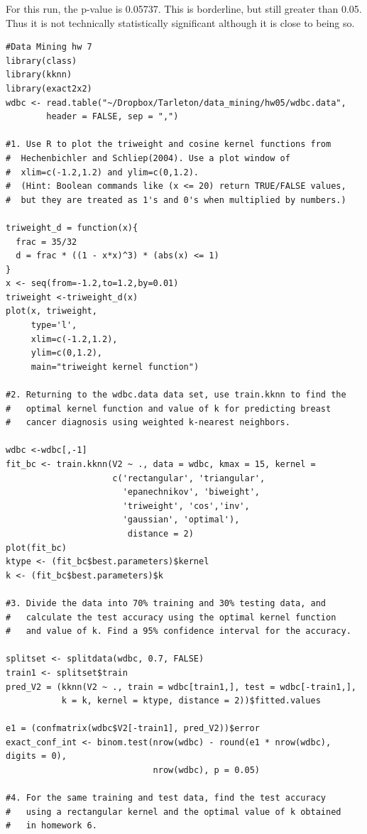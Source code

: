 \documentclass[11pt]{article}
\begin{document}
\begin{enumerate}
    For this run, the p-value is 0.05737. This is borderline, but still 
    greater than 0.05. Thus it is not technically statistically significant 
    although it is close to being so. 

\singlespace
\begin{Verbatim}
#Data Mining hw 7
library(class)
library(kknn)
library(exact2x2)
wdbc <- read.table("~/Dropbox/Tarleton/data_mining/hw05/wdbc.data", 
        header = FALSE, sep = ",")

#1. Use R to plot the triweight and cosine kernel functions from 
#  Hechenbichler and Schliep(2004). Use a plot window of 
#  xlim=c(-1.2,1.2) and ylim=c(0,1.2). 
#  (Hint: Boolean commands like (x <= 20) return TRUE/FALSE values, 
#  but they are treated as 1's and 0's when multiplied by numbers.)

triweight_d = function(x){
  frac = 35/32
  d = frac * ((1 - x*x)^3) * (abs(x) <= 1)
}
x <- seq(from=-1.2,to=1.2,by=0.01)
triweight <-triweight_d(x)
plot(x, triweight, 
     type='l',
     xlim=c(-1.2,1.2),
     ylim=c(0,1.2),
     main="triweight kernel function")

#2. Returning to the wdbc.data data set, use train.kknn to find the 
#   optimal kernel function and value of k for predicting breast 
#   cancer diagnosis using weighted k-nearest neighbors. 

wdbc <-wdbc[,-1]
fit_bc <- train.kknn(V2 ~ ., data = wdbc, kmax = 15, kernel = 
                     c('rectangular', 'triangular', 
                       'epanechnikov', 'biweight', 
                       'triweight', 'cos','inv', 
                       'gaussian', 'optimal'),
                        distance = 2)
plot(fit_bc)
ktype <- (fit_bc$best.parameters)$kernel
k <- (fit_bc$best.parameters)$k

#3. Divide the data into 70% training and 30% testing data, and 
#   calculate the test accuracy using the optimal kernel function 
#   and value of k. Find a 95% confidence interval for the accuracy. 

splitset <- splitdata(wdbc, 0.7, FALSE)
train1 <- splitset$train
pred_V2 = (kknn(V2 ~ ., train = wdbc[train1,], test = wdbc[-train1,], 
           k = k, kernel = ktype, distance = 2))$fitted.values

e1 = (confmatrix(wdbc$V2[-train1], pred_V2))$error
exact_conf_int <- binom.test(nrow(wdbc) - round(e1 * nrow(wdbc), digits = 0), 
                             nrow(wdbc), p = 0.05)

#4. For the same training and test data, find the test accuracy 
#   using a rectangular kernel and the optimal value of k obtained 
#   in homework 6. 


\end{Verbatim}
\end{enumerate}
\end{document}
